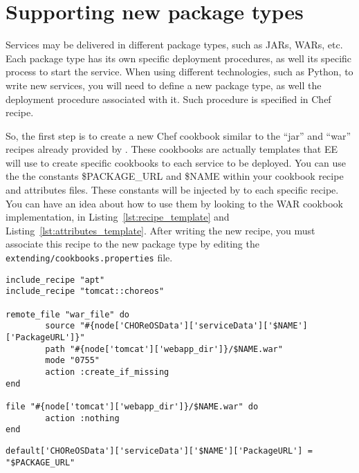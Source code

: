 \section{Supporting new package types}

Services may be delivered in different package types, such as JARs, WARs, etc.
Each package type has its own specific deployment procedures, as well its specific process to start the service.
When using different technologies, such as Python, to write new services, you will need to define a new package type,
as well the deployment procedure associated with it. Such procedure is specified in Chef recipe. 

So, the first step is to create a new Chef cookbook similar to the ``jar'' and ``war'' recipes already provided by \ee.
These cookbooks are actually templates that EE will use to create specific cookbooks to each service to be deployed.
You can use the the constants \$PACKAGE\_URL and \$NAME within your cookbook recipe and attributes files. These constants will be injected by \ee to each specific recipe.
You can have an idea about how to use them by looking to the WAR cookbook implementation, in Listing~\ref{lst:recipe_template} and Listing~\ref{lst:attributes_template}.
After writing the new recipe, you must associate this recipe to the new package type by editing the \texttt{extending/cookbooks.properties} file.

\begin{lstlisting}[frame=trbl, label=lst:recipe_template, caption=Recipe template for WAR deployment.]
include_recipe "apt" 
include_recipe "tomcat::choreos"

remote_file "war_file" do
        source "#{node['CHOReOSData']['serviceData']['$NAME']['PackageURL']}"
        path "#{node['tomcat']['webapp_dir']}/$NAME.war"
        mode "0755"
        action :create_if_missing
end

file "#{node['tomcat']['webapp_dir']}/$NAME.war" do
        action :nothing
end
\end{lstlisting}

\begin{lstlisting}[frame=trbl, label=lst:attributes_template, caption=Attributes template for WAR deployment.]
default['CHOReOSData']['serviceData']['$NAME']['PackageURL'] = "$PACKAGE_URL"
\end{lstlisting}


%
%
%
%

